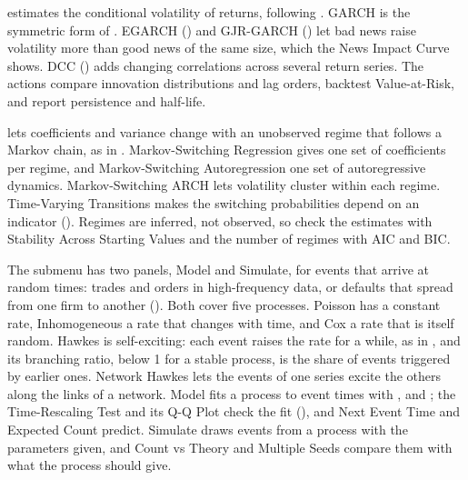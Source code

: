  estimates the conditional volatility of returns, following . GARCH is the symmetric form of . EGARCH () and GJR-GARCH () let bad news raise volatility more than good news of the same size, which the News Impact Curve shows. DCC () adds changing correlations across several return series. The actions compare innovation distributions and lag orders, backtest Value-at-Risk, and report persistence and half-life.

 lets coefficients and variance change with an unobserved regime that follows a Markov chain, as in . Markov-Switching Regression gives one set of coefficients per regime, and Markov-Switching Autoregression one set of autoregressive dynamics. Markov-Switching ARCH lets volatility cluster within each regime. Time-Varying Transitions makes the switching probabilities depend on an indicator (). Regimes are inferred, not observed, so check the estimates with Stability Across Starting Values and the number of regimes with AIC and BIC.

The submenu  has two panels, Model and Simulate, for events that arrive at random times: trades and orders in high-frequency data, or defaults that spread from one firm to another (). Both cover five processes. Poisson has a constant rate, Inhomogeneous a rate that changes with time, and Cox a rate that is itself random. Hawkes is self-exciting: each event raises the rate for a while, as in , and its branching ratio, below 1 for a stable process, is the share of events triggered by earlier ones. Network Hawkes lets the events of one series excite the others along the links of a network. Model fits a process to event times with ,  and ; the Time-Rescaling Test and its Q-Q Plot check the fit (), and Next Event Time and Expected Count predict. Simulate draws events from a process with the parameters given, and Count vs Theory and Multiple Seeds compare them with what the process should give.

